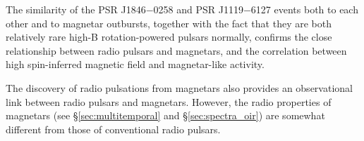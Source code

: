 The similarity of the PSR J1846$-$0258 and PSR J1119$-$6127 events both to each other and to magnetar
outbursts, together with the fact that they are both relatively rare high-B rotation-powered pulsars normally,
confirms the close relationship between radio pulsars and magnetars, and
the correlation between high spin-inferred magnetic field and magnetar-like activity.   

The discovery of radio pulsations from magnetars \citep[see \S\ref{sec:multitemporal}][]{crh+06,crhr07} also 
provides an observational link between radio
pulsars and magnetars.  However, the radio properties of magnetars
(see \S\ref{sec:multitemporal} and \S\ref{sec:spectra_oir}) are somewhat different from
those of conventional radio pulsars.


